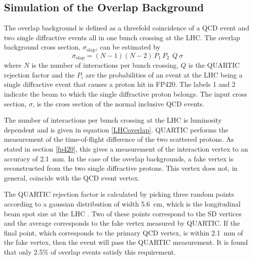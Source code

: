 \subsection{Simulation of the Overlap Background}\label{overlap}

The overlap background is defined as a threefold coincidence of a QCD event and two single diffractive events all in one bunch crossing at the LHC. The overlap background cross section, $\sigma_{\text{olap}}$, can be estimated by 
\begin{equation}\label{overlapxs}
\sigma_{\text{olap}} = \left(N-1\right)\left( N-2\right) \,  P_1 \,  P_2 \, ~Q ~\sigma
\end{equation}
where $N$ is the number of interactions per bunch crossing, $Q$ is the QUARTIC rejection factor and the $P_i$ are the probabilities of an event at the LHC being a single diffractive event that causes a proton hit in FP420.  The labels 1 and 2 indicate the beam to which the single diffractive proton belongs. The input cross section, $\sigma$, is the cross section of the normal inclusive QCD events.

The number of interactions per bunch crossing at the LHC is luminosity dependent and is given in equation \ref{LHCoverlap}. QUARTIC performs the measurement of the time-of-flight difference of the two scattered protons. 
As stated in section \ref{fp420}, this gives a measurement of the interaction vertex to an accuracy of 2.1~mm. In the case of the overlap backgrounds, a fake vertex is reconstructed from the two single diffractive protons. This vertex does not, in general, coincide with the QCD event vertex.

The QUARTIC rejection factor is calculated by picking three random points according to a gaussian distribution of width 5.6~cm, which is the longitudinal beam spot size at the LHC \cite{:1999fq:Chapter3}. Two of these points correspond to the SD vertices and the average corresponds to the fake vertex measured by QUARTIC. If the final point, which corresponds to the primary QCD vertex, is within 2.1~mm of the fake vertex, then the event will pass the QUARTIC measurement. It is found that only 2.5\% of overlap events satisfy this requirement. 

